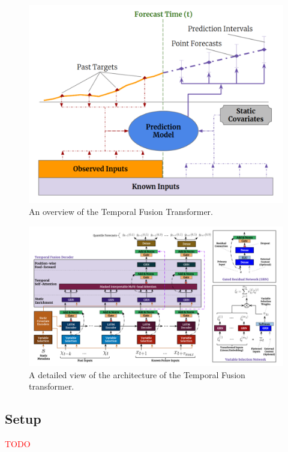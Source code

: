     \begin{figure}[ht!]
        \centering
        \includegraphics[scale=0.4]{imgs/TFT1.png}
        \caption{An overview of the Temporal Fusion Transformer.\cite{lim_temporal_2020}
        \label{fig:tft_overviwew}}
    \end{figure}
\newpage
    \begin{figure}[ht!]
        \centering
        \includegraphics[scale=0.27]{imgs/TFT.png}
        \caption{A detailed view of the architecture of the Temporal Fusion transformer.\cite{lim_temporal_2020}
        \label{fig:ttgt_detail}}
    \end{figure}
    
    
    \newpage
    \subsection{Setup}
    \textcolor{red}{TODO}
    
